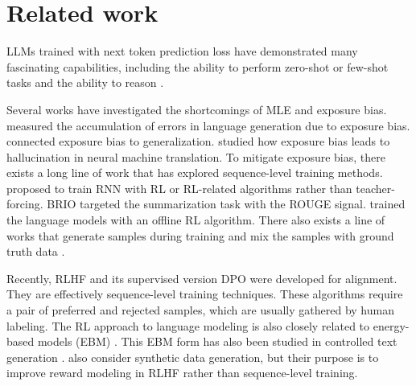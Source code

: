 \section{Related work}

LLMs trained with next token prediction loss \citep{radford2019language,chung2022scaling,sanh2021multitask,zhou2023lima} have demonstrated many fascinating capabilities, including the ability to perform zero-shot or few-shot tasks \citep{radford2019language,brown2020language} and the ability to reason \citep{wei2022chain}. 

Several works have investigated the shortcomings of MLE and exposure bias. \citet{arora2022exposure} measured the accumulation of errors in language generation due to exposure bias. \citet{schmidt2019generalization} connected exposure bias to generalization. \citet{wang2020exposure} studied how exposure bias leads to hallucination in neural machine translation. To mitigate exposure bias, there exists a long line of work that has explored sequence-level training methods. \citet{bengio2015scheduled,ranzato2015sequence} proposed to train RNN with RL or RL-related algorithms rather than teacher-forcing. BRIO \citet{liu2022brio} targeted the summarization task with the ROUGE signal. \citet{pang2020text} trained the language models with an offline RL algorithm. There also exists a line of works that generate samples during training and mix the samples with ground truth data \citep{shen2015minimum,zhang2019bridging,duckworth2019parallel}. 

Recently, RLHF \citep{stiennon2020learning,ouyang2022training} and its supervised version DPO \citep{rafailov2023direct} were developed for alignment. They are effectively sequence-level training techniques. These algorithms require a pair of preferred and rejected samples, which are usually gathered by human labeling. The RL approach to language modeling is also closely related to energy-based models (EBM) \citep{korbak2022rl, deng2020residual}. This EBM form has also been studied in controlled text generation \citet{kumar2022gradient}. \citet{pace2024west} also consider synthetic data generation, but their purpose is to improve reward modeling in RLHF rather than sequence-level training. 
